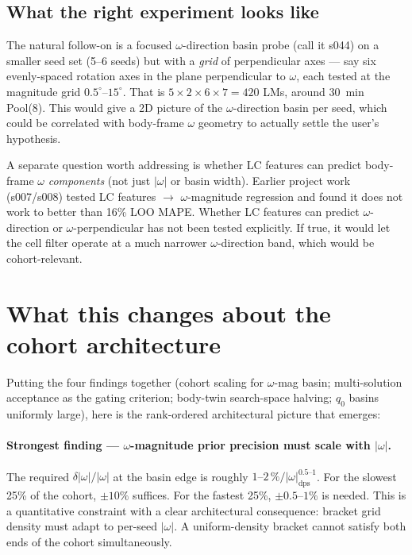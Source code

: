 \documentclass[11pt,a4paper]{article}
\begin{document}
\subsection{What the right experiment looks like}

The natural follow-on is a focused $\omega$-direction basin probe (call it s044) on a smaller seed set (5--6 seeds) but with a \emph{grid} of perpendicular axes --- say six evenly-spaced rotation axes in the plane perpendicular to $\omega$, each tested at the magnitude grid $0.5^\circ$--$15^\circ$. That is $5 \times 2 \times 6 \times 7 = 420$ LMs, around 30~min Pool(8). This would give a 2D picture of the $\omega$-direction basin per seed, which could be correlated with body-frame $\omega$ geometry to actually settle the user's hypothesis.

A separate question worth addressing is whether LC features can predict body-frame $\omega$ \emph{components} (not just $|\omega|$ or basin width). Earlier project work (s007/s008) tested LC features $\to$ $\omega$-magnitude regression and found it does not work to better than 16\% LOO MAPE. Whether LC features can predict $\omega$-direction or $\omega$-perpendicular has not been tested explicitly. If true, it would let the cell filter operate at a much narrower $\omega$-direction band, which would be cohort-relevant.

\section{What this changes about the cohort architecture}
\label{sec:architecture}

Putting the four findings together (cohort scaling for $\omega$-mag basin; multi-solution acceptance as the gating criterion; body-twin search-space halving; $q_0$ basins uniformly large), here is the rank-ordered architectural picture that emerges:

\paragraph{Strongest finding --- $\omega$-magnitude prior precision must scale with $|\omega|$.} The required $\delta|\omega|/|\omega|$ at the basin edge is roughly $1\text{--}2\,\%/|\omega|_{\mathrm{dps}}^{0.5\text{--}1}$. For the slowest 25\% of the cohort, $\pm 10\%$ suffices. For the fastest 25\%, $\pm 0.5\text{--}1\%$ is needed. This is a quantitative constraint with a clear architectural consequence: bracket grid density must adapt to per-seed $|\omega|$. A uniform-density bracket cannot satisfy both ends of the cohort simultaneously.
\end{document}
